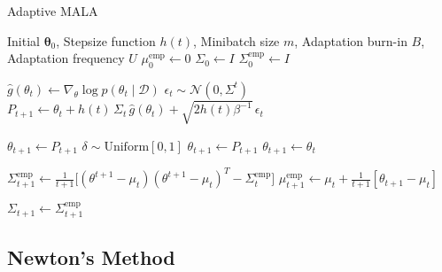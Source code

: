 \documentclass{article}
\theoremstyle{remark}
\theoremstyle{definition}
\begin{document}
\begin{algorithm}
\caption{Adaptive MALA}\label{alg:cap}
\begin{algorithmic}

\Require Initial $\boldsymbol{\theta}_0$, Stepsize function $h(t)$, Minibatch size $m$, Adaptation burn-in $B$, Adaptation frequency $U$
\State $\mu_0^{\mathrm{emp}} \gets 0$
\State $\Sigma_0 \gets I$
\State $\Sigma_0^{\mathrm{emp}} \gets I$

    \State $\hat{g}(\theta_t) \gets \nabla_\theta \log{p(\theta_t \mid \mathcal{D})}$
    \State $\epsilon_t \sim \mathcal{N}(0, \Sigma^t)$
    \State $P_{t+1} \gets \theta_t + h(t) \, \Sigma_t \, \hat{g}(\theta_t) + \sqrt{2 h(t) \beta^{-1}} \, \epsilon_t$ 
    
        \State $\theta_{t+1} \gets P_{t+1}$
    \Else 
        \State $\delta \sim \mathrm{Uniform}[0, 1]$ 
            \State $\theta_{t+1} \gets P_{t+1}$ 
        \Else 
            \State $\theta_{t+1} \gets \theta_t$
        \EndIf
    \EndIf
    
    \State $\Sigma^\mathrm{emp}_{t+1} \gets \frac{1}{t+1} \big[(\theta^{t+1} - \mu_t) (\theta^{t+1} - \mu_t)^T - \Sigma^\mathrm{emp}_t \big]$
    \State $\mu_{t+1}^\mathrm{emp} \gets \mu_t + \frac{1}{t+1} [ \theta_{t+1} - \mu_t ]$
    
        \State $\Sigma_{t+1} \gets \Sigma_{t+1}^{\mathrm{emp}}$
    \EndIf
\EndFor

\end{algorithmic}
\end{algorithm}

\pagebreak 

\subsection{Newton's Method}
\end{document}
